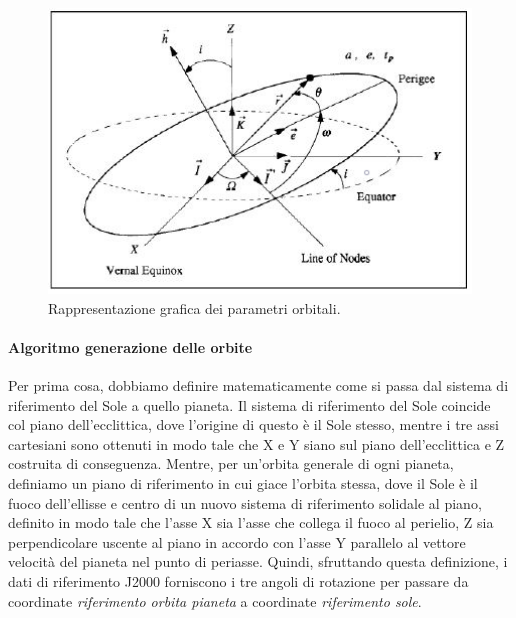 \documentclass[a4paper]{article}
\begin{document}
\begin{figure}[htbp]
\centering
\includegraphics[width=1\textwidth]{Parametri_orbitali.png}
\caption{Rappresentazione grafica dei parametri orbitali.}
\end{figure}

\paragraph{Algoritmo generazione delle orbite\newline}
Per prima cosa, dobbiamo definire matematicamente come si passa dal sistema di riferimento del Sole a quello pianeta. \newline Il sistema di riferimento del Sole coincide col piano dell'ecclittica, dove l'origine di questo è il Sole stesso, mentre i tre assi cartesiani sono ottenuti in modo tale che X e Y siano sul piano dell'ecclittica e Z costruita di conseguenza.
Mentre, per un'orbita generale di ogni pianeta, definiamo un piano di riferimento in cui giace l'orbita stessa, dove il Sole è il fuoco dell'ellisse e centro di un nuovo sistema di riferimento solidale al piano, definito in modo tale che l'asse X sia l'asse che collega il fuoco al perielio, Z sia perpendicolare uscente al piano in accordo con l'asse Y parallelo al vettore velocità del pianeta nel punto di periasse.
Quindi, sfruttando questa definizione, i dati di riferimento J2000 forniscono i tre angoli di rotazione per passare da coordinate \textit{riferimento orbita pianeta} a coordinate \textit{riferimento sole}.
\end{document}
